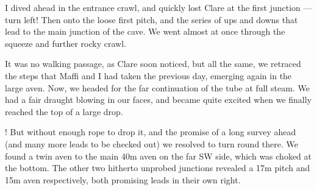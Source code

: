 I dived ahead in the entrance crawl, and quickly lost Clare at the first junction --- turn left! Then onto the loose first pitch, and the series of ups and downs that lead to the main junction of the cave. We went  almost at once through the squeeze and further rocky crawl.

It was no walking passage, as Clare soon noticed, but all the same, we retraced the steps that Maffi and I had taken the previous day, emerging again in the large aven. Now, we headed for the far continuation of the tube at full steam. We had a fair draught blowing in our faces, and became quite excited when we finally reached the top of a large drop. 

! But without enough rope to drop it, and the promise of a long survey ahead (and many more leads to be checked out) we resolved to turn round there. We found a twin aven to the main 40m aven on the far SW side, which was choked at the bottom. The other two hitherto unprobed junctions revealed a 17m pitch and 15m aven respectively, both promising leads in their own right.



